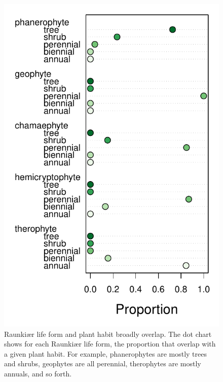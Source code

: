 \documentclass[12pt, oneside]{article}
\begin{document}
\begin{figure}[ht]
\centerline{\includegraphics{figures/figureS_compare-growth-forms.pdf}}
\caption{Raunki\ae r life form and plant habit broadly overlap. The dot chart shows for each Raunki\ae r life form, the proportion that overlap with a given plant habit. For example, phanerophytes are mostly trees and shrubs, geophytes are all perennial, therophytes are mostly annuals, and so forth.}
\label{fig:compare-growth-forms}
\end{figure}
\end{document}
